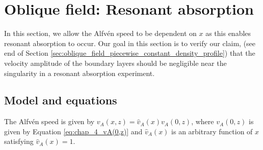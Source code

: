\section{Oblique field: Resonant absorption}
\label{sec:oblique_field_resonant_absorption}

In this section, we allow the Alfv\'en speed to be dependent on $x$ as this enables resonant absorption to occur. Our goal in this section is to verify our claim, (see end of Section \ref{sec:oblique_field_piecewise_constant_density_profile}) that the velocity amplitude of the boundary layers should be negligible near the singularity in a resonant absorption experiment.

\subsection{Model and equations}

The Alfv\'en speed is given by $v_A(x,z)=\hat{v}_A(x)v_A(0,z)$, where $v_A(0,z)$ is given by Equation \eqref{eq:chap_4_vA(0,z)} and $\hat{v}_A(x)$ is an arbitrary function of $x$ satisfying $\hat{v}_A(x)=1$. 

